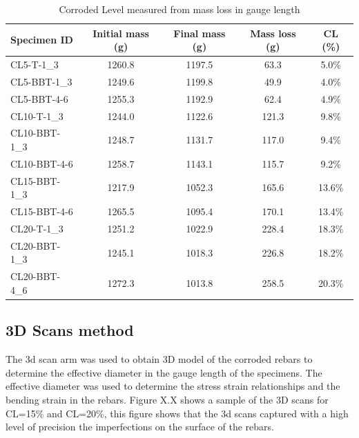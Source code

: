 \begin{table}[]
\caption{Corroded Level measured from mass loss in gauge length}
\label{tab:CL_mass_loss}
\begin{center}
\begin{tabular}{lcccc}
Specimen ID & Initial mass (g) & Final mass (g) & Mass loss (g) & CL (\%) \\ \hline
CL5-T-1\_3    & 1260.8           & 1197.5         & 63.3          & 5.0\%   \\
CL5-BBT-1\_3  & 1249.6           & 1199.8         & 49.9          & 4.0\%   \\
CL5-BBT-4-6   & 1255.3           & 1192.9         & 62.4          & 4.9\%   \\
CL10-T-1\_3   & 1244.0           & 1122.6         & 121.3         & 9.8\%   \\
CL10-BBT-1\_3 & 1248.7           & 1131.7         & 117.0         & 9.4\%   \\
CL10-BBT-4-6  & 1258.7           & 1143.1         & 115.7         & 9.2\%   \\
CL15-BBT-1\_3 & 1217.9           & 1052.3         & 165.6         & 13.6\%  \\
CL15-BBT-4-6  & 1265.5           & 1095.4         & 170.1         & 13.4\%  \\
CL20-T-1\_3   & 1251.2           & 1022.9         & 228.4         & 18.3\%  \\
CL20-BBT-1\_3 & 1245.1           & 1018.3         & 226.8         & 18.2\%  \\
CL20-BBT-4\_6  & 1272.3           & 1013.8         & 258.5         & 20.3\% 
\end{tabular}
\end{center}
\end{table}

\subsection{3D Scans method}

The 3d scan arm was used to obtain 3D model of the corroded rebars to determine the effective diameter in the gauge length of the specimens. The effective diameter was used to determine the stress strain relationships and the bending strain in the rebars. Figure X.X shows a sample of the 3D scans for CL=15\% and CL=20\%, this figure shows that the 3d scans captured with a high level of precision the imperfections on the surface of the rebars. 

